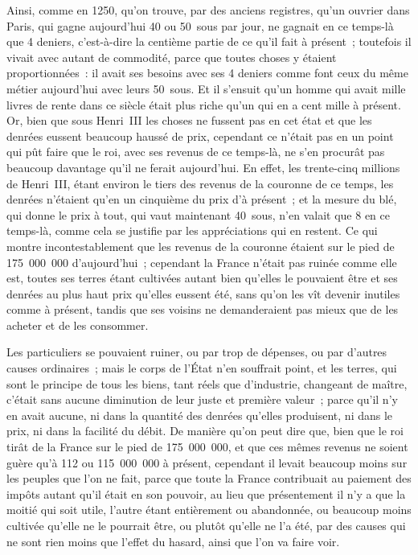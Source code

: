 \documentclass[french,twoside]{book} %
\begin{document}
Ainsi, comme en 1250, qu’on trouve, par des anciens registres, qu’un ouvrier dans Paris, qui gagne aujourd’hui 40 ou 50 sous par jour, ne gagnait en ce temps-là que 4 deniers, c’est-à-dire la centième partie de ce qu’il fait à présent ; toutefois il vivait avec autant de commodité, parce que toutes choses y étaient proportionnées : il avait ses besoins avec ses 4 deniers comme font ceux du même métier aujourd’hui avec leurs 50 sous. Et il s’ensuit qu’un homme qui avait mille livres de rente dans ce siècle était plus riche qu’un qui en a cent mille à présent. Or, bien que sous Henri III les choses ne fussent pas en cet état et que les denrées eussent beaucoup haussé de prix, cependant ce n’était pas en un point qui pût faire que le roi, avec ses revenus de ce temps-là, ne s’en procurât pas beaucoup davantage qu’il ne ferait aujourd’hui. En effet, les trente-cinq millions de Henri III, étant environ le tiers des revenus de la couronne de ce temps, les denrées n’étaient qu’en un cinquième du prix d’à présent ; et la mesure du blé, qui donne le prix à tout, qui vaut maintenant 40 sous, n’en valait que 8 en ce temps-là, comme cela se justifie par les appréciations qui en restent. Ce qui montre incontestablement que les revenus de la couronne étaient sur le pied de 175 000 000 d’aujourd’hui ; cependant la France n’était pas ruinée comme elle est, toutes ses terres étant cultivées autant bien qu’elles le pouvaient être et ses denrées au plus haut prix qu’elles eussent été, sans qu’on les vît devenir inutiles comme à présent, tandis que ses voisins ne demanderaient pas mieux que de les acheter et de les consommer.\par
Les particuliers se pouvaient ruiner, ou par trop de dépenses, ou par d’autres causes ordinaires ; mais le corps de l’État n’en souffrait point, et les terres, qui sont le principe de tous les biens, tant réels que d’industrie, changeant de maître, c’était sans aucune diminution de leur juste et première valeur ; parce qu’il n’y en avait aucune, ni dans la quantité des denrées qu’elles produisent, ni dans le prix, ni dans la facilité du débit. De manière qu’on peut dire que, bien que le roi tirât de la France sur le pied de 175 000 000, et que ces mêmes revenus ne soient guère qu’à 112 ou 115 000 000 à présent, cependant il levait beaucoup moins sur les peuples que l’on ne fait, parce que toute la France contribuait au paiement des impôts autant qu’il était en son pouvoir, au lieu que présentement il n’y a que la moitié qui soit utile, l’autre étant entièrement ou abandonnée, ou beaucoup moins cultivée qu’elle ne le pourrait être, ou plutôt qu’elle ne l’a été, par des causes qui ne sont rien moins que l’effet du hasard, ainsi que l’on va faire voir.
\end{document}
